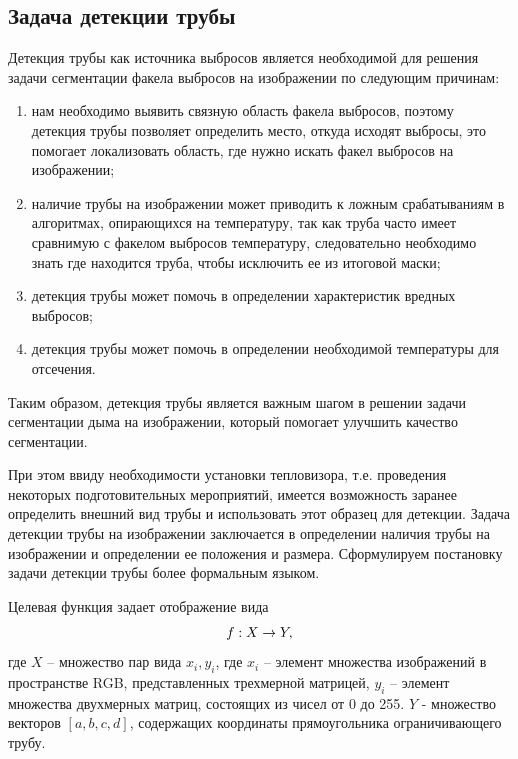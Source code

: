 \documentclass[14pt, a4paper]{extreport}
\begin{document}
\subsection{Задача детекции трубы}
	Детекция трубы как источника выбросов является необходимой для решения задачи сегментации факела выбросов на изображении по следующим причинам:
	\begin{enumerate}[label={\arabic*)}]
		\item нам необходимо выявить связную область факела выбросов, поэтому детекция трубы позволяет определить место, откуда исходят выбросы, это помогает локализовать область, где нужно искать факел выбросов на изображении;
		\item наличие трубы на изображении может приводить к ложным срабатываниям в алгоритмах, опирающихся на температуру, так как труба часто имеет сравнимую с факелом выбросов температуру, следовательно необходимо знать где находится труба, чтобы исключить ее из итоговой маски;
		\item детекция трубы может помочь в определении характеристик вредных выбросов; 
		\item детекция трубы может помочь в определении необходимой температуры для отсечения. 
	\end{enumerate}
	Таким образом, детекция трубы является важным шагом в решении задачи сегментации дыма на изображении, который помогает улучшить качество сегментации.
	
	При этом ввиду необходимости установки тепловизора, т.е. проведения некоторых подготовительных мероприятий, имеется возможность заранее определить внешний вид трубы и использовать этот образец для детекции. Задача детекции трубы на изображении заключается в определении наличия трубы на изображении и определении ее положения и размера. Сформулируем постановку задачи детекции трубы более формальным языком.
	
	Целевая функция задает отображение вида
	\vspace*{-0.2cm}
	\begin{equation}
		f : X \rightarrow Y,
		\label{f:x->[4]}
		\vspace*{-0.4cm}
	\end{equation}
	где $X$ -- множество пар вида $x_i, y_i$, где $x_i$ -- элемент множества изображений в пространстве RGB, представленных трехмерной матрицей, $y_i$ -- элемент множества двухмерных матриц, состоящих из чисел от 0 до 255. $Y$ - множество векторов $[a, b, c, d]$, содержащих координаты прямоугольника ограничивающего трубу. 
	
\end{document}
